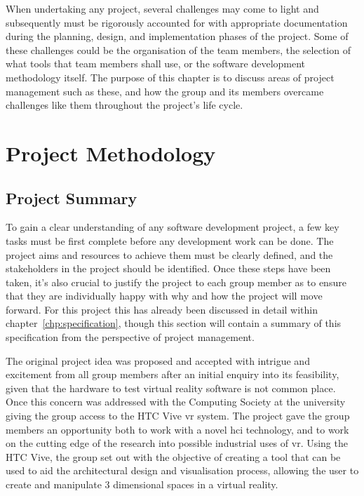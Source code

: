 When undertaking any project, several challenges may come to light and subsequently must be rigorously accounted for with appropriate documentation during the planning, design, and implementation phases of the project. Some of these challenges could be the organisation of the team members, the selection of what tools that team members shall use, or the software development methodology itself. The purpose of this chapter is to discuss areas of project management such as these, and how the group and its members overcame challenges like them throughout the project's life cycle.

\section{Project Methodology}

    \subsection{Project Summary}        
    
        To gain a clear understanding of any software development project, a few key tasks must be first complete before any development work can be done. The project aims and resources to achieve them must be clearly defined, and the stakeholders in the project should be identified. Once these steps have been taken, it's also crucial to justify the project to each group member as to ensure that they are individually happy with why and how the project will move forward. For this project this has already been discussed in detail within chapter~\ref{chp:specification}, though this section will contain a summary of this specification from the perspective of project management.
        
        The original project idea was proposed and accepted with intrigue and excitement from all group members after an initial enquiry into its feasibility, given that the hardware to test virtual reality software is not common place. Once this concern was addressed with the Computing Society at the university giving the group access to the HTC Vive \acrshort{vr} system. The project gave the group members an opportunity both to work with a novel \acrshort{hci} technology, and to work on the cutting edge of the research into possible industrial uses of \acrshort{vr}. Using the HTC Vive, the group set out with the objective of creating a tool that can be used to aid the architectural design and visualisation process, allowing the user to create and manipulate 3 dimensional spaces in a virtual reality.
        
